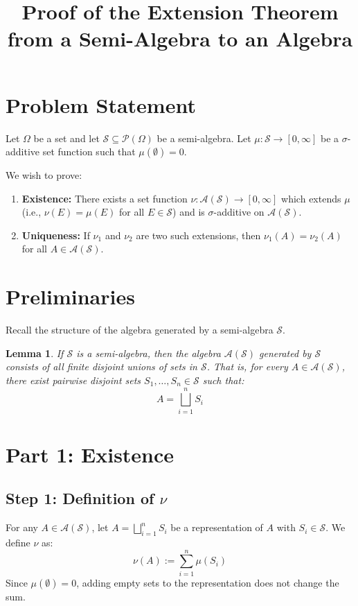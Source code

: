 \documentclass[12pt, a4paper]{article}
\title{Proof of the Extension Theorem from a Semi-Algebra to an Algebra}
\author{}
\date{}
\newtheorem{lemma}{Lemma}
\theoremstyle{definition}
\newcommand{\Sem}{\mathcal{S}} %
\newcommand{\Alg}{\mathcal{A}(\mathcal{S})} %
\newcommand{\DisjointUnion}{\bigsqcup}
\begin{document}
\maketitle

\section*{Problem Statement}
Let $\Omega$ be a set and let $\Sem \subseteq \mathcal{P}(\Omega)$ be a semi-algebra. Let $\mu: \Sem \to [0, \infty]$ be a $\sigma$-additive set function such that $\mu(\emptyset) = 0$.

We wish to prove:
\begin{enumerate}
    \item \textbf{Existence:} There exists a set function $\nu: \Alg \to [0, \infty]$ which extends $\mu$ (i.e., $\nu(E) = \mu(E)$ for all $E \in \Sem$) and is $\sigma$-additive on $\Alg$.
    \item \textbf{Uniqueness:} If $\nu_1$ and $\nu_2$ are two such extensions, then $\nu_1(A) = \nu_2(A)$ for all $A \in \Alg$.
\end{enumerate}

\section{Preliminaries}
Recall the structure of the algebra generated by a semi-algebra $\Sem$.
\begin{lemma}
    If $\Sem$ is a semi-algebra, then the algebra $\Alg$ generated by $\Sem$ consists of all finite disjoint unions of sets in $\Sem$. That is, for every $A \in \Alg$, there exist pairwise disjoint sets $S_1, \dots, S_n \in \Sem$ such that:
    \[
    A = \DisjointUnion_{i=1}^n S_i
    \]
\end{lemma}

\section{Part 1: Existence}

\subsection{Step 1: Definition of $\nu$}
For any $A \in \Alg$, let $A = \DisjointUnion_{i=1}^n S_i$ be a representation of $A$ with $S_i \in \Sem$. We define $\nu$ as:
\begin{equation} \label{def:nu}
    \nu(A) := \sum_{i=1}^n \mu(S_i)
\end{equation}
Since $\mu(\emptyset)=0$, adding empty sets to the representation does not change the sum.
\end{document}
